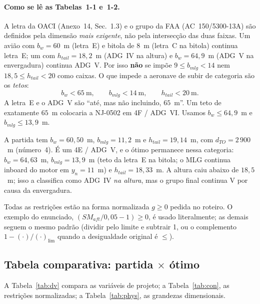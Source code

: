 \paragraph{Como se lê as Tabelas~1-1 e~1-2.}
A letra da OACI (Anexo~14, Sec.~1.3) e o grupo da FAA (AC~150/5300-13A)
são definidos pela dimensão \emph{mais exigente}, não pela
intersecção das duas faixas. Um avião com $b_w=60$~m (letra~E) e
bitola de $8$~m (letra~C na bitola) continua letra~E; um com
$h_{tail}=18{,}2$~m (ADG~IV na altura) e $b_w=64{,}9$~m (ADG~V na
envergadura) continua ADG~V. Por isso \textbf{não} se impõe
$9\le b_{mlg}<14$ nem $18{,}5\le h_{tail}<20$ como caixas. O que impede a
aeronave de subir de categoria são os \emph{tetos}:
\begin{equation}
b_w < 65~\mathrm{m},\qquad
b_{mlg} < 14~\mathrm{m},\qquad
h_{tail} < 20~\mathrm{m}.
\end{equation}
A letra~E e o ADG~V são ``até, mas não incluindo, $65$~m''. Um teto
de exatamente $65$~m colocaria a NJ-0502 em 4F / ADG~VI. Usamos
$b_w\le 64{,}9$~m e $b_{mlg}\le 13{,}9$~m.

A partida tem $b_w=60{,}50$~m, $b_{mlg}=11{,}2$~m e $h_{tail}=19{,}14$~m,
com $d_{TO}=2\,900$~m (número~4). É um 4E / ADG~V, e o ótimo
permanece nessa categoria: $b_w=64{,}63$~m, $b_{mlg}=13{,}9$~m (teto da
letra~E na bitola; o MLG continua inboard do motor em $y_n=11$~m) e
$h_{tail}=18{,}33$~m.
A altura caiu abaixo de $18{,}5$~m; isso a classifica como ADG~IV \emph{na
altura}, mas o grupo final continua V por causa da envergadura.

Todas as restrições estão na forma normalizada $g\ge 0$ pedida no
roteiro. O exemplo do enunciado, $(SM_{aft}/0{,}05-1)\ge 0$, é usado
literalmente; as demais seguem o mesmo padrão (dividir pelo limite e
subtrair 1, ou o complemento $1-(\cdot)/(\cdot)_{\lim}$ quando a
desigualdade original é $\le$).

\subsection{Tabela comparativa: partida $\times$ ótimo}
\label{sec:p3q3}

A Tabela~\ref{tab:dv} compara as variáveis de projeto; a
Tabela~\ref{tab:con}, as restrições normalizadas; a
Tabela~\ref{tab:phys}, as grandezas dimensionais.

\begin{table}[H]
\centering
\caption{Variáveis de projeto --- configuração de PRJ-22 e ótimo.}
\label{tab:dv}
\small

\end{table}

